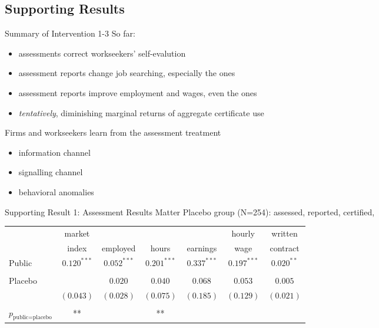 \subsection*{Supporting Results}
\begin{frame}{Summary of Intervention 1-3}
    So far: 
    \begin{itemize}
        \small
        \item assessments correct workseekers' self-evalution
        \item assessment reports change job searching, especially the  ones
        \item assessment reports improve employment and wages, even the  ones
        \item \textit{tentatively}, diminishing marginal returns of aggregate certificate use
    \end{itemize}
    
    \vspace*{10pt}
    Firms and workseekers  learn from the assessment treatment
    \begin{itemize}
        \small
        \item<3->[A] information channel
        \item<4->[B] signalling channel
        \item<5->[C] behavioral anomalies 
    \end{itemize}
\end{frame}

\begin{frame}{Supporting Result 1: Assessment Results Matter}
    Placebo group (N=254): assessed, reported, certified, 
    \begin{center}
        \small
        \begin{tabular}{lcccccc}
        & market & & & & hourly & written \\ 
        & index & employed & hours & earnings & wage & contract \\ \hline
       Public & $0.120^{***}$ & ${0.052^{***}}$ & {$0.201^{***}$} & {$0.337^{***}$} & {$0.197^{***}$} & {$0.020^{**}$} \\
       & \\
       Placebo & \uncover<2>{$0.027$ & $0.020$ & $0.040$ & $0.068$ & $0.053$ & $0.005$ \\
       & $(0.043)$ & $(0.028)$ & $(0.075)$ & $(0.185)$ & $(0.129)$& $(0.021)$ \\
       &\\
       $p_{\text{public=placebo}}$ & ** & & ** & & & }
        \end{tabular}
    \end{center}
\end{frame}

